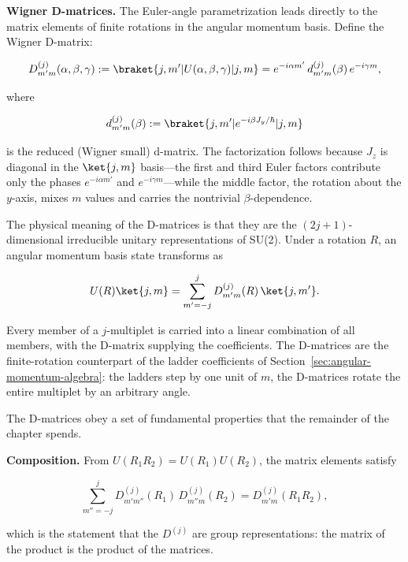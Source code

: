 \medskip\noindent\textbf{Wigner D-matrices.} The Euler-angle parametrization leads directly to the matrix elements of finite rotations in the angular momentum basis. Define the Wigner D-matrix:
\begin{linenomath}
    \begin{equation}
        D^{(j)}_{m'm}(\alpha,\beta,\gamma) := \braket{j,m'|U(\alpha,\beta,\gamma)|j,m}
        = e^{-i\alpha m'}\,d^{(j)}_{m'm}(\beta)\,e^{-i\gamma m},
        \label{eq:D-matrix-def}
    \end{equation}
\end{linenomath}
where
\begin{linenomath}
    \begin{equation}
        d^{(j)}_{m'm}(\beta) := \braket{j,m'|e^{-i\beta J_y/\hbar}|j,m}
    \end{equation}
\end{linenomath}
is the reduced (Wigner small) d-matrix. The factorization follows because $J_z$ is diagonal in the $\ket{j,m}$ basis---the first and third Euler factors contribute only the phases $e^{-i\alpha m'}$ and $e^{-i\gamma m}$---while the middle factor, the rotation about the $y$-axis, mixes $m$ values and carries the nontrivial $\beta$-dependence.

The physical meaning of the D-matrices is that they are the $(2j+1)$-dimensional irreducible unitary representations of SU(2). Under a rotation $R$, an angular momentum basis state transforms as
\begin{linenomath}
    \begin{equation}
        U(R)\ket{j,m} = \sum_{m'=-j}^{j} D^{(j)}_{m'm}(R)\,\ket{j,m'}.
    \end{equation}
\end{linenomath}
Every member of a $j$-multiplet is carried into a linear combination of all members, with the D-matrix supplying the coefficients. The D-matrices are the finite-rotation counterpart of the ladder coefficients of Section~\ref{sec:angular-momentum-algebra}: the ladders step by one unit of $m$, the D-matrices rotate the entire multiplet by an arbitrary angle.

The D-matrices obey a set of fundamental properties that the remainder of the chapter spends.

\medskip\noindent\textbf{Composition.} From $U(R_1R_2)=U(R_1)U(R_2)$, the matrix elements satisfy
\begin{linenomath}
    \begin{equation}
        \sum_{m''=-j}^{j} D^{(j)}_{m'm''}(R_1)\,D^{(j)}_{m''m}(R_2)
        = D^{(j)}_{m'm}(R_1R_2),
    \end{equation}
\end{linenomath}
which is the statement that the $D^{(j)}$ are group representations: the matrix of the product is the product of the matrices.

